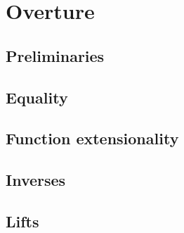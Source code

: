 \section{Overture}\label{sec:overture}

\subsection{Preliminaries}\label{preliminaries}


\subsection{Equality}\label{equality} %


\subsection{Function extensionality}\label{function-extensionality}


\subsection{Inverses}\label{sec:inverse-image-invers}


\subsection{Lifts}\label{sec:lifts-altern-univ}




